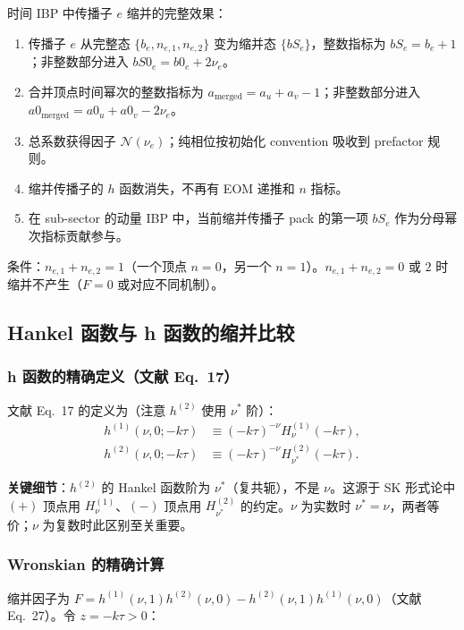 ﻿\documentclass[a4paper,11pt]{article}
\begin{document}
时间 IBP 中传播子 $e$ 缩并的完整效果：

\begin{enumerate}
  \item 传播子 $e$ 从完整态 $\{b_e, n_{e,1}, n_{e,2}\}$ 变为缩并态 $\{bS_e\}$，整数指标为 $bS_e=b_e+1$；非整数部分进入 $bS0_e=b0_e+2\nu_e$。
  \item 合并顶点时间幂次的整数指标为 $a_{\text{merged}} = a_u + a_v - 1$；非整数部分进入 $a0_{\text{merged}}=a0_u+a0_v-2\nu_e$。
  \item 总系数获得因子 $\mathcal{N}(\nu_e)$；纯相位按初始化 convention 吸收到 prefactor 规则。
  \item 缩并传播子的 $h$ 函数消失，不再有 EOM 递推和 $n$ 指标。
  \item 在 sub-sector 的动量 IBP 中，当前缩并传播子 pack 的第一项 $bS_e$ 作为分母幂次指标贡献参与。
\end{enumerate}

条件：$n_{e,1} + n_{e,2} = 1$（一个顶点 $n=0$，另一个 $n=1$）。$n_{e,1} + n_{e,2} = 0$ 或 $2$ 时缩并不产生（$F = 0$ 或对应不同机制）。

\subsection{Hankel 函数与 h 函数的缩并比较}

\subsubsection{h 函数的精确定义（文献 Eq.~17）}

文献 Eq.~17 的定义为（注意 $h^{(2)}$ 使用 $\nu^*$ 阶）：
\begin{align}
  h^{(1)}(\nu, 0; -k\tau) &\equiv (-k\tau)^{-\nu} H_\nu^{(1)}(-k\tau), \\
  h^{(2)}(\nu, 0; -k\tau) &\equiv (-k\tau)^{-\nu} H_{\nu^*}^{(2)}(-k\tau).
  \label{hdef_explicit}
\end{align}

\textbf{关键细节}：$h^{(2)}$ 的 Hankel 函数阶为 $\nu^*$（复共轭），不是 $\nu$。这源于 SK 形式论中 $(+)$ 顶点用 $H_\nu^{(1)}$、$(-)$ 顶点用 $H_{\nu^*}^{(2)}$ 的约定。$\nu$ 为实数时 $\nu^*=\nu$，两者等价；$\nu$ 为复数时此区别至关重要。

\subsubsection{Wronskian 的精确计算}

缩并因子为 $F = h^{(1)}(\nu,1) h^{(2)}(\nu,0) - h^{(2)}(\nu,1) h^{(1)}(\nu,0)$（文献 Eq.~27）。令 $z = -k\tau > 0$：
\end{document}
